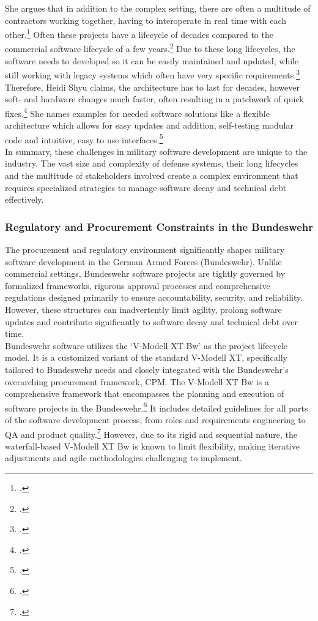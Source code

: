 She argues that in addition to the complex setting, there are often a multitude of contractors working together, having to interoperate in real time with each other.\footcite[11]{shyu2017military}
Often these projects have a lifecycle of decades compared to the commercial software lifecycle of a few years.\footcite[14]{shyu2017military}
Due to these long lifecycles, the software needs to developed so it can be easily maintained and updated, while still working with legacy systems
which often have very specific requirements.\footcite[14]{shyu2017military}
Therefore, Heidi Shyu claims, the architecture has to last for decades, however soft- and hardware changes much faster, often resulting in a patchwork of quick fixes.\footcite[15]{shyu2017military}
She names examples for needed software solutions like a flexible architecture which allows for easy updates and addition, self-testing modular code and intuitive, easy to use interfaces.\footcite[17]{shyu2017military}\\

In summary, these challenges in military software development are unique to the industry. The vast size and complexity of defense systems,
their long lifecycles and the multitude of stakeholders involved create a complex environment that requires specialized strategies to manage software decay and technical debt effectively.

\subsubsection{Regulatory and Procurement Constraints in the Bundeswehr}
The procurement and regulatory environment significantly shapes military software development in the German Armed Forces (Bundeswehr). Unlike commercial settings,
Bundeswehr software projects are tightly governed by formalized frameworks, rigorous approval processes and comprehensive regulations designed primarily to ensure 
accountability, security, and reliability. However, these structures can inadvertently limit agility, prolong software updates and contribute significantly to software decay
and technical debt over time.\\

Bundeswehr software utilizes the `V-Modell XT Bw' as the project lifecycle model. It is a customized variant of the standard V-Modell XT, specifically tailored to Bundeswehr needs and closely integrated with the 
Bundeswehr's overarching procurement framework, \ac{CPM}.
The V-Modell XT Bw is a comprehensive framework that encompasses the planning and execution of software projects in the Bundeswehr.\footcite[6]{bundeswehrVModellXTBw}
It includes detailed guidelines for all parts of the software development process, from roles and requirements engineering to \ac{QA} and product quality.\footcite[pp. 20-21]{bundeswehrVModellXTBw}
However, due to its rigid and sequential nature, the waterfall-based V-Modell XT Bw is known to limit flexibility, making iterative adjustments and agile methodologies challenging to implement.\\

